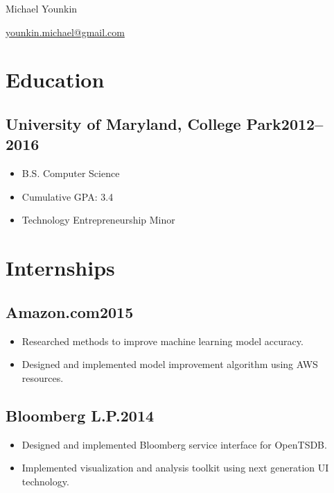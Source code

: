 \documentclass[letterpaper]{article}
\newcommand{\subsectiondate}[2]{\subsection*{#1\hfill#2}}
\begin{document}
\begin{center}
    {\LARGE Michael Younkin}

    \href{mailto:younkin.michael@gmail.com}{younkin.michael@gmail.com}
\end{center}


\section*{Education}

\subsectiondate{University of Maryland, College Park}{2012--2016}

\begin{itemize}
    \item B.S. Computer Science
    \item Cumulative GPA\@: 3.4
    \item Technology Entrepreneurship Minor
\end{itemize}


\section*{Internships}

\subsectiondate{Amazon.com}{2015}

\begin{itemize}
    \item Researched methods to improve machine learning model accuracy.
    \item Designed and implemented model improvement algorithm using AWS resources.
\end{itemize}

\subsectiondate{Bloomberg L.P.}{2014}

\begin{itemize}
    \item Designed and implemented Bloomberg service interface for OpenTSDB.
    \item Implemented visualization and analysis toolkit using next generation UI technology.
\end{itemize}
\end{document}
